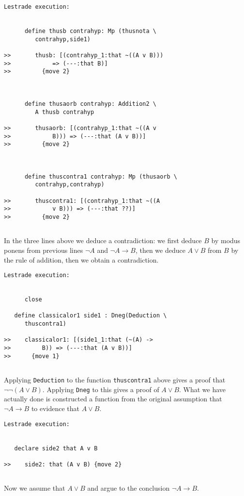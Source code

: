 \documentclass[12pt]{article}
\begin{document}
\begin{verbatim}Lestrade execution:


      define thusb contrahyp: Mp (thusnota \
         contrahyp,side1)

>>       thusb: [(contrahyp_1:that ~((A v B)))
>>            => (---:that B)]
>>         {move 2}



      define thusaorb contrahyp: Addition2 \
         A thusb contrahyp

>>       thusaorb: [(contrahyp_1:that ~((A v
>>            B))) => (---:that (A v B))]
>>         {move 2}



      define thuscontra1 contrahyp: Mp (thusaorb \
         contrahyp,contrahyp)

>>       thuscontra1: [(contrahyp_1:that ~((A
>>            v B))) => (---:that ??)]
>>         {move 2}


\end{verbatim}

In the three lines above we deduce a contradiction:  we first deduce $B$ by modus ponens from previous lines $\neg A$ and $\neg A \rightarrow B$,
then we deduce $A \vee B$ from $B$ by the rule of addition, then we obtain a contradiction.

\begin{verbatim}Lestrade execution:


      close

   define classicalor1 side1 : Dneg(Deduction \
      thuscontra1)

>>    classicalor1: [(side1_1:that (~(A) ->
>>         B)) => (---:that (A v B))]
>>      {move 1}


\end{verbatim}

Applying {\tt Deduction} to the function {\tt thuscontra1} above gives a proof that $\neg \neg (A \vee B)$.  Applying {\tt Dneg} to this gives a proof
of $A \vee B$.  What we have actually done is constructed a function from the original assumption that $\neg A \rightarrow B$ to evidence that $A \vee B$.

\begin{verbatim}Lestrade execution:


   declare side2 that A v B

>>    side2: that (A v B) {move 2}


\end{verbatim}

Now we assume that $A \vee B$ and argue to the conclusion $\neg A \rightarrow B$.
\end{document}
